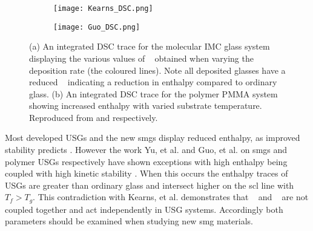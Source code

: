 \documentclass[a4paper,12pt,oneside]{report}%
\begin{document}
\begin{figure}[bp]
	\centering
	\begin{subfigure}[htbp]{0.75\textwidth}
		\texttt{[image: Kearns\_DSC.png]}
		\caption{}
		\label{fig:DSC_IMC}
	\end{subfigure}
	\begin{subfigure}[htbp]{0.75\textwidth}
		\texttt{[image: Guo\_DSC.png]}
		\caption{}
		\label{fig:DSC_PMMA}
	\end{subfigure}
	\caption[(a) An integrated DSC trace for the molecular IMC glass system displaying the various values of \Tf~ obtained when varying the deposition rate (the coloured lines). Note all deposited glasses have a reduced \Tf~ indicating a reduction in enthalpy compared to ordinary glass. (b) An integrated DSC trace for the polymer PMMA system showing increased enthalpy with varied substrate temperature.]{(a) An integrated DSC trace for the molecular IMC glass system displaying the various values of \Tf~ obtained when varying the deposition rate (the coloured lines). Note all deposited glasses have a reduced \Tf~ indicating a reduction in enthalpy compared to ordinary glass. (b) An integrated DSC trace for the polymer PMMA system showing increased enthalpy with varied substrate temperature. Reproduced from \cite{Kearns2008} and \cite{Guo2012} respectively.}%
	\label{fig:DSC_IMC_PMMA}
\end{figure} 

Most developed USGs and the new \glspl{smg} display reduced enthalpy, as improved stability predicts \cite{Aji2013, Wang2014}. However the work Yu, et al. \cite{Yu2013} and Guo, et al. \cite{Guo2012} on \glspl{smg} and polymer USGs respectively have shown exceptions with high enthalpy being coupled with high kinetic stability \dTg. When this occurs the enthalpy traces of USGs are greater than ordinary glass and intersect higher on the \gls{scl} line with $T_{f} > T_{g}$. This contradiction with Kearns, et al. \cite{Kearns2008} demonstrates that \Tonset~ and \Tf~ are not coupled together and act independently in USG systems. Accordingly both parameters should be examined when studying new \gls{smg} materials. 
\end{document}
